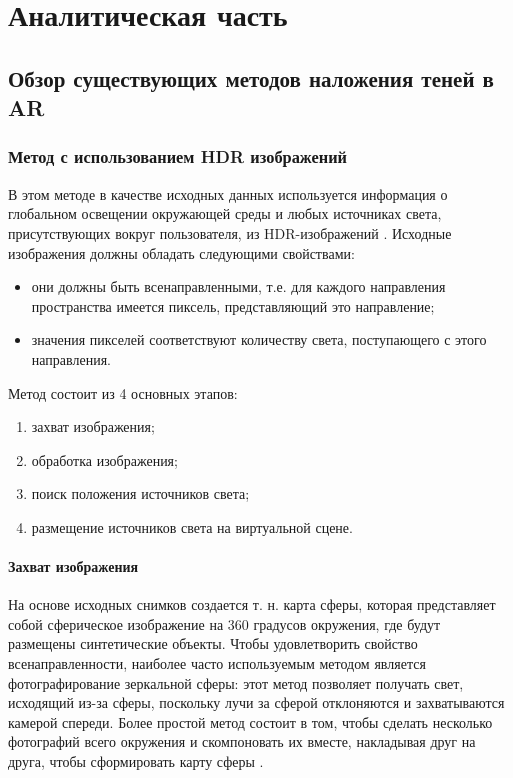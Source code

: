 \chapter{Аналитическая часть}


\section{Обзор существующих методов наложения теней в AR}

\subsection{Метод с использованием HDR изображений}

В этом методе в качестве исходных данных используется информация о глобальном освещении окружающей среды и любых источниках света, присутствующих вокруг пользователя, из HDR-изображений \cite{hdri, rtsm}. Исходные изображения должны обладать следующими свойствами:

\begin{itemize}
	\item они должны быть всенаправленными, т.е. для каждого направления пространства имеется пиксель, представляющий это направление;
	\item значения пикселей соответствуют количеству света, поступающего с этого направления.
\end{itemize}

Метод состоит из 4 основных этапов:

\begin{enumerate}
	\item захват изображения;
	\item обработка изображения;
	\item поиск положения источников света;
	\item размещение источников света на виртуальной сцене.
\end{enumerate}

\subsubsection*{Захват изображения}

На основе исходных снимков создается т. н. карта сферы, которая представляет собой сферическое изображение на 360 градусов окружения, где будут размещены синтетические объекты. Чтобы удовлетворить свойство всенаправленности, наиболее часто используемым методом является фотографирование зеркальной сферы: этот метод позволяет получать свет, исходящий из-за сферы, поскольку лучи за сферой отклоняются и захватываются камерой спереди. Более простой метод состоит в том, чтобы сделать несколько фотографий всего окружения и скомпоновать их вместе, накладывая друг на друга, чтобы сформировать карту сферы \cite{rtsm}.

